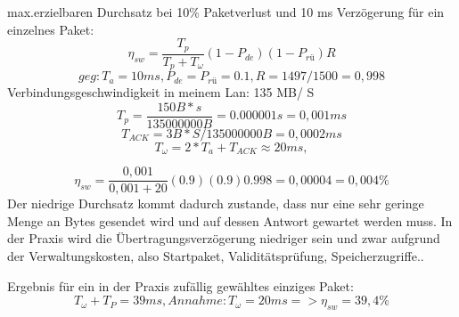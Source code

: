 \documentclass[a4paper,10pt]{article}
\begin{document}
	max.erzielbaren Durchsatz bei 10\% Paketverlust und 10 ms Verzögerung für ein einzelnes Paket:
	\begin{equation}
		\label{simple_equation}
		\eta_{sw} = 
		\frac{T_{p}}{T_{p}+T_{\omega}}(1-P_{de})(1-P_{rü})R
	\end{equation}
	\begin{equation}	
		geg: T_{a} = 10ms, P_{de} = P_{rü} = 0.1, 
		R = 1497/1500 = 0,998
	\end{equation}
	Verbindungsgeschwindigkeit in meinem Lan: 135 MB/ S
	\begin{equation}	
		T_{p} = \frac{150B*s}{135000000B} = 0.000001 s = 0,001 ms
	\end{equation}
		\begin{equation}	
		T_{ACK} = 3B*S / 135000000B = 0,0002 ms
		\end{equation}
	\begin{equation}	
		T_{\omega} =  2 * T_{a} + T_{ACK}  \approx 20ms,
	\end{equation}


	\begin{equation}
	\label{simple_equation}
	\eta_{sw} = 
	\frac{0,001}{0,001+20}(0.9)(0.9)0.998 = 0,00004 = 0,004\%
	\end{equation}
	Der niedrige Durchsatz kommt dadurch zustande, dass nur eine sehr geringe Menge an Bytes gesendet wird und auf dessen Antwort gewartet werden muss. 
	In der Praxis wird die Übertragungsverzögerung niedriger sein und zwar  aufgrund der Verwaltungskosten, also Startpaket, Validitätsprüfung, Speicherzugriffe..
	
	Ergebnis für ein in der Praxis zufällig gewähltes einziges Paket:
	\begin{equation}	
	T_{\omega} + T_{P} =  39ms, Annahme: T_{\omega} = 20ms
	=> \eta_{sw} = 39,4\%
	\end{equation}
	
	
\end{document}
